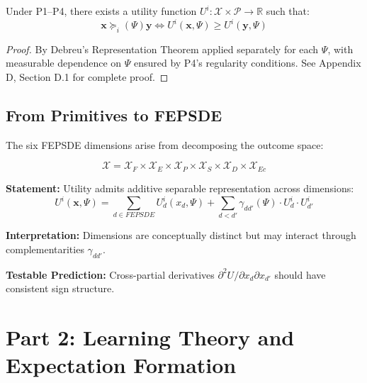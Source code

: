\begin{proposition}
Under P1--P4, there exists a utility function $U^i: \mathcal{X} \times \mathcal{P} \to \mathbb{R}$
such that:
\begin{equation}
\mathbf{x} \succeq_i(\Psi) \mathbf{y} \Leftrightarrow U^i(\mathbf{x}, \Psi) \geq U^i(\mathbf{y}, \Psi)
\end{equation}
\end{proposition}

\begin{proof}
By Debreu's Representation Theorem applied separately for each $\Psi$, with
measurable dependence on $\Psi$ ensured by P4's regularity conditions.
See Appendix D, Section D.1 for complete proof.
\end{proof}

\subsection{From Primitives to FEPSDE}

The six FEPSDE dimensions arise from decomposing the outcome space:

\begin{equation}
\mathcal{X} = \mathcal{X}_F \times \mathcal{X}_E \times \mathcal{X}_P \times
\mathcal{X}_S \times \mathcal{X}_D \times \mathcal{X}_{Ec}
\end{equation}

\begin{tcolorbox}[colback=gray!5!white, colframe=gray!75!black,
    title=Axiom AZ-M2: Dimensional Separability]
\textbf{Statement:} Utility admits additive separable representation across dimensions:
\begin{equation}
U^i(\mathbf{x}, \Psi) = \sum_{d \in FEPSDE} U^i_d(x_d, \Psi) + \sum_{d < d'} \gamma_{dd'}(\Psi) \cdot U^i_d \cdot U^i_{d'}
\end{equation}

\textbf{Interpretation:} Dimensions are conceptually distinct but may interact
through complementarities $\gamma_{dd'}$.

\textbf{Testable Prediction:} Cross-partial derivatives $\partial^2 U / \partial x_d \partial x_{d'}$
should have consistent sign structure.
\end{tcolorbox}


\section{Part 2: Learning Theory and Expectation Formation}
\label{sec:az-learning}

